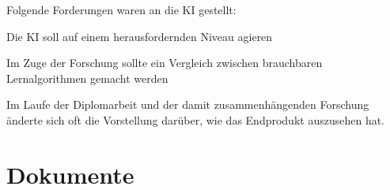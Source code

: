 Folgende Forderungen waren an die KI gestellt: 
\begin{compactitem}
    \item Die KI soll auf einem herausfordernden Niveau agieren
    \item Im Zuge der Forschung sollte ein Vergleich zwischen brauchbaren Lernalgorithmen gemacht werden
\end{compactitem}


Im Laufe der Diplomarbeit und der damit zusammenhängenden Forschung änderte sich oft die
Vorstellung darüber, wie das Endprodukt auszusehen hat.


\section{Dokumente}
